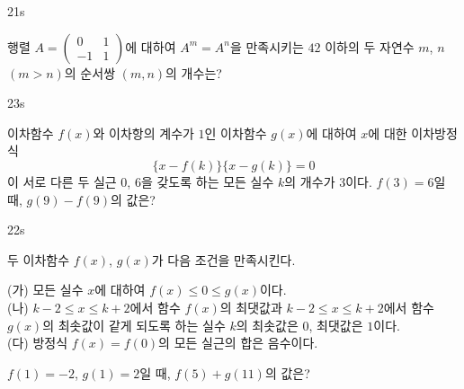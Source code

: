 \documentclass[10pt]{article}
\begin{document}
\begin{pagepair}
\noindent
\begin{minipage}[t][\probboxheight][t]{0.46\linewidth}
\begin{problem}{21}{s}
\par\smallskip
행렬 $A = \begin{pmatrix} 0 & 1 \\ -1 & 1 \end{pmatrix}$에 대하여 $A^m = A^n$을 만족시키는 $42$ 이하의 두 자연수 $m$, $n$ $(m > n)$의 순서쌍 $(m, n)$의 개수는?
\begin{choices}
\end{choices}
\end{problem}
\end{minipage}\hfill
\begin{minipage}[t][\probboxheight][t]{0.46\linewidth}
\begin{problem}{23}{s}
\par\smallskip
이차함수 $f(x)$와 이차항의 계수가 $1$인 이차함수 $g(x)$에 대하여 $x$에 대한 이차방정식
\[ \{x - f(k)\}\{x - g(k)\} = 0 \]
이 서로 다른 두 실근 $0$, $6$을 갖도록 하는 모든 실수 $k$의 개수가 $3$이다. $f(3) = 6$일 때, $g(9) - f(9)$의 값은?
\begin{choices}
\end{choices}
\end{problem}
\end{minipage}
\par\vspace{4mm}
\noindent
\begin{minipage}[t][\probboxheight][t]{0.46\linewidth}
\begin{problem}{22}{s}
\par\smallskip
두 이차함수 $f(x)$, $g(x)$가 다음 조건을 만족시킨다.
\begin{conditions}
(가) 모든 실수 $x$에 대하여 $f(x) \le 0 \le g(x)$이다. \\[3pt]
(나) $k - 2 \le x \le k + 2$에서 함수 $f(x)$의 최댓값과 $k - 2 \le x \le k + 2$에서 함수 $g(x)$의 최솟값이 같게 되도록 하는 실수 $k$의 최솟값은 $0$, 최댓값은 $1$이다. \\[3pt]
(다) 방정식 $f(x) = f(0)$의 모든 실근의 합은 음수이다.
\end{conditions}

$f(1) = -2$, $g(1) = 2$일 때, $f(5) + g(11)$의 값은?
\begin{choices}
\end{choices}
\end{problem}
\end{minipage}\hfill
\begin{minipage}[t][\probboxheight][t]{0.46\linewidth}\end{minipage}
\end{pagepair}
\end{document}
